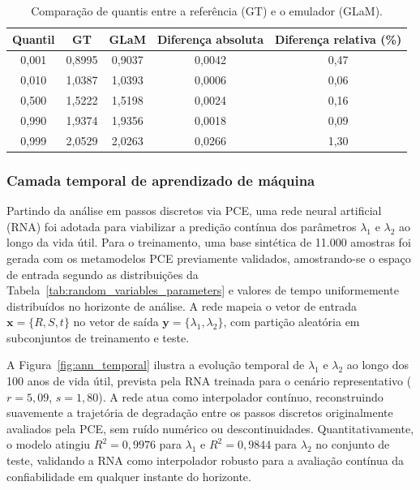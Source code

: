 \begin{table}[H]
\centering
\caption{Comparação de quantis entre a referência (GT) e o emulador (GLaM).}
\label{tab:quantile_comparison}
\begin{tabular}{ccccc}
\hline
Quantil & GT & GLaM & Diferença absoluta & Diferença relativa (\%) \\
\hline
0,001 & 0,8995 & 0,9037 & 0,0042 & 0,47 \\
0,010 & 1,0387 & 1,0393 & 0,0006 & 0,06 \\
0,500 & 1,5222 & 1,5198 & 0,0024 & 0,16 \\
0,990 & 1,9374 & 1,9356 & 0,0018 & 0,09 \\
0,999 & 2,0529 & 2,0263 & 0,0266 & 1,30 \\
\hline
\end{tabular}
\end{table}


\subsubsection{Camada temporal de aprendizado de m\'aquina}

Partindo da análise em passos discretos via PCE, uma rede neural artificial (RNA) foi adotada para viabilizar a predição contínua dos parâmetros $\lambda_1$ e $\lambda_2$ ao longo da vida útil. Para o treinamento, uma base sintética de 11.000 amostras foi gerada com os metamodelos PCE previamente validados, amostrando-se o espaço de entrada segundo as distribuições da Tabela~\ref{tab:random_variables_parameters} e valores de tempo uniformemente distribuídos no horizonte de análise. A rede mapeia o vetor de entrada $\mathbf{x} = \{R, S, t\}$ no vetor de saída $\mathbf{y} = \{\lambda_1, \lambda_2\}$, com partição aleatória em subconjuntos de treinamento e teste.

A Figura~\ref{fig:ann_temporal} ilustra a evolução temporal de $\lambda_1$ e $\lambda_2$ ao longo dos 100 anos de vida útil, prevista pela RNA treinada para o cenário representativo ($r=5{,}09$, $s=1{,}80$). A rede atua como interpolador contínuo, reconstruindo suavemente a trajetória de degradação entre os passos discretos originalmente avaliados pela PCE, sem ruído numérico ou descontinuidades. Quantitativamente, o modelo atingiu $R^2 = 0{,}9976$ para $\lambda_1$ e $R^2 = 0{,}9844$ para $\lambda_2$ no conjunto de teste, validando a RNA como interpolador robusto para a avaliação contínua da confiabilidade em qualquer instante do horizonte. 

